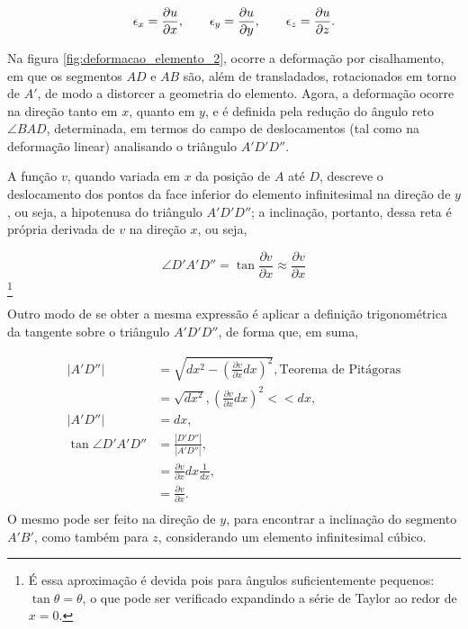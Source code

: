 \begin{equation}
    \epsilon_x = \frac{\partial u}{\partial x}, \qquad \epsilon_y = \frac{\partial u}{\partial y}, \qquad \epsilon_z = \frac{\partial u}{\partial z}. \\
\end{equation}

Na figura \ref{fig:deformacao_elemento_2}, ocorre a deformação por cisalhamento, em que os segmentos $AD$ e $AB$ são, além de transladados, rotacionados em torno de $A'$, de modo a distorcer a geometria do elemento. Agora, a deformação ocorre na direção tanto em $x$, quanto em $y$, e é definida pela redução do ângulo reto $\angle BAD$, determinada, em termos do campo de deslocamentos (tal como na deformação linear) analisando o triângulo $A'D'D''$.

A função $v$, quando variada em $x$ da posição de $A$ até $D$, descreve o deslocamento dos pontos da face inferior do elemento infinitesimal na direção de $y$, ou seja, a hipotenusa do triângulo $A'D'D''$; a inclinação, portanto, dessa reta é própria derivada de $v$ na direção $x$, ou seja,

\begin{equation}
    \angle D'A'D'' = \tan{\frac{\partial v}{\partial x}} \approx \frac{\partial v}{\partial x}
\end{equation}\footnote{É essa aproximação é devida pois para ângulos suficientemente pequenos: $\tan \theta = \theta$, o que pode ser verificado expandindo a série de Taylor ao redor de $x=0$.}

Outro modo de se obter a mesma expressão é aplicar a definição trigonométrica da tangente sobre o triângulo $A'D'D''$, de forma que, em suma,

\begin{align}
    |A'D''|             &= \sqrt{dx^2 -  \left(\frac{\partial v}{\partial x}dx\right)^2}, \text{Teorema de Pitágoras}\\
                         &= \sqrt{dx^2}, \left(\frac{\partial v}{\partial x}dx\right)^2 << dx,\\
    |A'D''|              &= dx,\\
    \tan{\angle D'A'D''} &= \frac{|D'D''|}{|A'D''|}, \\
                         &= \frac{\partial v}{\partial x}dx \frac{1}{dx},\\
                         & = \frac{\partial v}{\partial x}.\\
\end{align}
O mesmo pode ser feito na direção de $y$, para encontrar a inclinação do segmento $A'B'$, como também para $z$, considerando um elemento infinitesimal cúbico.

